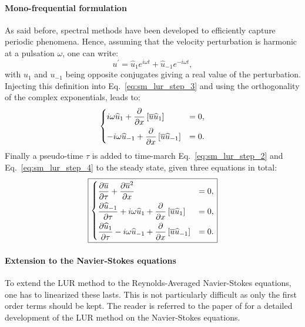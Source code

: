 \paragraph{Mono-frequential formulation}
As said before, spectral methods have been developed to efficiently
capture periodic phenomena.
Hence, assuming that the velocity perturbation is harmonic at 
a pulsation $\omega$, one can write:
\begin{equation}
	u^\prime = \widehat{u}_1 e^{i \omega t} + \widehat{u}_{-1} e^{-i \omega t},
\end{equation}
with $u_1$ and $u_{-1}$ being opposite conjugates giving a
real value of the perturbation.
Injecting this definition into Eq.~\ref{eq:sm_lur_step_3} and using
the orthogonality of the complex exponentials, leads
to:
\begin{equation}
	\begin{dcases}
		i \omega \widehat{u}_1 +
		\frac{\partial}{\partial x} \left[
		\overline{u} \widehat{u}_1 \right] &= 
		0, \\
		-i \omega \widehat{u}_{-1} +
		\frac{\partial}{\partial x} \left[
		\overline{u} \widehat{u}_{-1} \right] &= 
		0.
	\end{dcases}
	\label{eq:sm_lur_step_4}
\end{equation}
Finally a pseudo-time $\tau$ is added to time-march 
Eq.~\ref{eq:sm_lur_step_2} and Eq.~\ref{eq:sm_lur_step_4}
to the steady state, given three equations in total:
\begin{equation}
	\fbox{$
	\begin{dcases}
		\frac{\partial \overline{u}}{\partial \tau} +
		\frac{\partial 
			\overline{u}^2}{\partial x} &= 0, \\
		\frac{\partial \widehat{u}_{-1}}{\partial \tau} +
		i \omega \widehat{u}_1 +
			\frac{\partial}{\partial x} \left[
			\overline{u} \widehat{u}_1 \right] &= 
			0, \\
		\frac{\partial \widehat{u}_1}{\partial \tau}
		-i \omega \widehat{u}_{-1} +
			\frac{\partial}{\partial x} \left[
			\overline{u} \widehat{u}_{-1} \right] &= 
			0.
	\end{dcases}
	$}
\end{equation}

\paragraph{Extension to the Navier-Stokes equations}
To extend the LUR method to the Reynolds-Averaged
Navier-Stokes equations, one has to linearized these lasts. This
is not particularly difficult as only the first order terms should
be kept. The reader is referred to the paper of \citet{Clark2000} for
a detailed development of the LUR method on the Navier-Stokes
equations.

